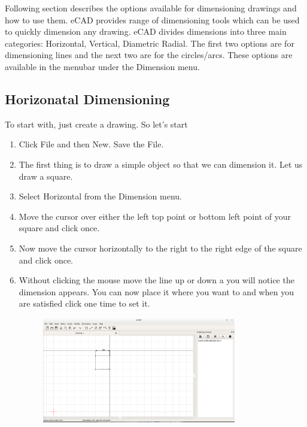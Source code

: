 Following section describes the options available for dimensioning drawings and how to use them. eCAD provides range of dimensioning tools which can be used to quickly dimension any drawing. eCAD divides dimensions into three main categories: Horizontal, Vertical, Diametric Radial. The first two options are for dimensioning lines and the next two are for the circles/arcs. These options are available in the menubar under the Dimension menu.
\subsection{Horizonatal Dimensioning} 
To start with, just create a drawing. So let's start
\begin{enumerate}
\item Click File and then New. Save the File.
\item The first thing is to draw a simple object so that we can dimension it. Let us draw a square.
\item Select Horizontal from the Dimension menu.
\item Move the cursor over either the left top point or bottom left point of your
square and click once.
\item Now move the cursor horizontally to the right to the right edge of the square
and click once.
\item Without clicking the mouse move the line up or down a you will notice the
dimension appears. You can now place it where you want to and when you are
satisfied click one time to set it.
\begin{figure}[h!]
\centering
\includegraphics[width=0.8\textwidth]{images/hdim.png}
\end{figure}
\end{enumerate}
